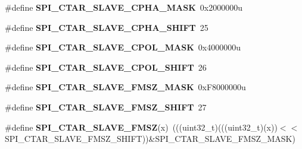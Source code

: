 \begin{DoxyCompactItemize}
\item 
\#define {\bfseries S\+P\+I\+\_\+\+C\+T\+A\+R\+\_\+\+S\+L\+A\+V\+E\+\_\+\+C\+P\+H\+A\+\_\+\+M\+A\+SK}~0x2000000u\hypertarget{group__SPI__Register__Masks_ga3e8aa9f143abc35fcb9f86e5de378621}{}\label{group__SPI__Register__Masks_ga3e8aa9f143abc35fcb9f86e5de378621}

\item 
\#define {\bfseries S\+P\+I\+\_\+\+C\+T\+A\+R\+\_\+\+S\+L\+A\+V\+E\+\_\+\+C\+P\+H\+A\+\_\+\+S\+H\+I\+FT}~25\hypertarget{group__SPI__Register__Masks_ga6470631f0d2f0d7722ab55a1f97c936e}{}\label{group__SPI__Register__Masks_ga6470631f0d2f0d7722ab55a1f97c936e}

\item 
\#define {\bfseries S\+P\+I\+\_\+\+C\+T\+A\+R\+\_\+\+S\+L\+A\+V\+E\+\_\+\+C\+P\+O\+L\+\_\+\+M\+A\+SK}~0x4000000u\hypertarget{group__SPI__Register__Masks_ga57c0bdc9ff5183b0e8da776a8d803ff1}{}\label{group__SPI__Register__Masks_ga57c0bdc9ff5183b0e8da776a8d803ff1}

\item 
\#define {\bfseries S\+P\+I\+\_\+\+C\+T\+A\+R\+\_\+\+S\+L\+A\+V\+E\+\_\+\+C\+P\+O\+L\+\_\+\+S\+H\+I\+FT}~26\hypertarget{group__SPI__Register__Masks_ga183134048ae879b82e3aa07b4a51d79d}{}\label{group__SPI__Register__Masks_ga183134048ae879b82e3aa07b4a51d79d}

\item 
\#define {\bfseries S\+P\+I\+\_\+\+C\+T\+A\+R\+\_\+\+S\+L\+A\+V\+E\+\_\+\+F\+M\+S\+Z\+\_\+\+M\+A\+SK}~0x\+F8000000u\hypertarget{group__SPI__Register__Masks_ga5230074b3809e2ef525e87fdca078717}{}\label{group__SPI__Register__Masks_ga5230074b3809e2ef525e87fdca078717}

\item 
\#define {\bfseries S\+P\+I\+\_\+\+C\+T\+A\+R\+\_\+\+S\+L\+A\+V\+E\+\_\+\+F\+M\+S\+Z\+\_\+\+S\+H\+I\+FT}~27\hypertarget{group__SPI__Register__Masks_gaf8ee524100dedae1cc3afb60643b2475}{}\label{group__SPI__Register__Masks_gaf8ee524100dedae1cc3afb60643b2475}

\item 
\#define {\bfseries S\+P\+I\+\_\+\+C\+T\+A\+R\+\_\+\+S\+L\+A\+V\+E\+\_\+\+F\+M\+SZ}(x)~(((uint32\+\_\+t)(((uint32\+\_\+t)(x))$<$$<$S\+P\+I\+\_\+\+C\+T\+A\+R\+\_\+\+S\+L\+A\+V\+E\+\_\+\+F\+M\+S\+Z\+\_\+\+S\+H\+I\+FT))\&S\+P\+I\+\_\+\+C\+T\+A\+R\+\_\+\+S\+L\+A\+V\+E\+\_\+\+F\+M\+S\+Z\+\_\+\+M\+A\+SK)\hypertarget{group__SPI__Register__Masks_ga20fc13a457a7df6331fdfdcbbc89c972}{}\label{group__SPI__Register__Masks_ga20fc13a457a7df6331fdfdcbbc89c972}


\end{DoxyCompactItemize}
